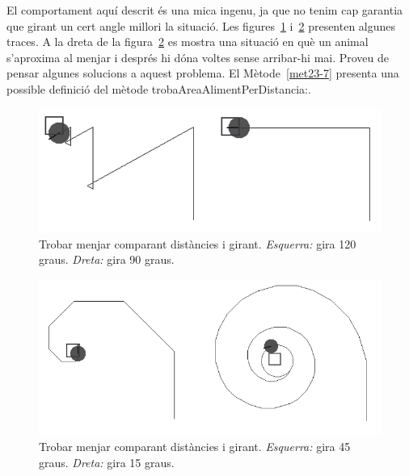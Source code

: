 El comportament aquí descrit és una mica ingenu, ja que no tenim cap garantia que girant un cert angle millori la situació. Les figures~\ref{fig2311} i~\ref{fig2312} presenten algunes traces. A la dreta de la figura~\ref{fig2312} es mostra una situació en què un animal s'aproxima al menjar i després hi dóna voltes sense arribar-hi mai. Proveu de pensar algunes solucions a aquest problema. El Mètode~\ref{met23-7} presenta una possible definició del mètode  \textsf{trobaAreaAlimentPerDistancia:}.
\begin{figure}[h!]
\begin{center}
\includegraphics[scale=2]{Imatges/figura23-11}
\end{center}
\caption{Trobar menjar comparant distàncies i girant. \emph{Esquerra:} gira 120 graus. \emph{Dreta:} gira 90 graus.}
\label{fig2311}
\end{figure}

\begin{figure}[h!]
\begin{center}
\includegraphics[scale=2]{Imatges/figura23-12}
\end{center}
\caption{Trobar menjar comparant distàncies i girant. \emph{Esquerra:} gira 45 graus. \emph{Dreta:} gira 15 graus.}
\label{fig2312}
\end{figure}

